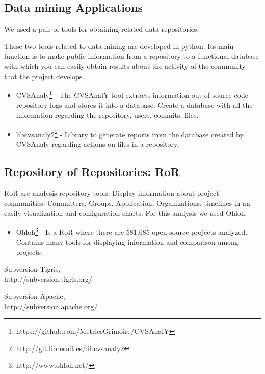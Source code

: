 \documentclass[11pt]{scrartcl}
\begin{document}
\subsection{Data mining Applications}

We used a pair of tools for obtaining related data repositories.

\par These two tools related to data mining are developed in python. Its main function is to make public information from a repository to a functional database with which you can easily obtain results about the activity of the community that the project develops.

\begin{itemize}
    \item CVSAnaly\footnote{https://github.com/MetricsGrimoire/CVSAnalY} - The CVSAnalY tool extracts information out of source code repository logs and stores it into a database. Create a database with all the information regarding the repository, users, commits, files.
    \item libcvsanaly2\footnote{http://git.libresoft.es/libcvsanaly2} - Library to generate reports from the database created by CVSAnaly regarding actions on files in a repository.
\end{itemize}

\subsection{Repository of Repositories: RoR}

RoR are analysis repository tools. Display information about project communities: Committers, Groups, Application, Organizations, timelines in an easily visualization and configuration charts. For this analysis we used Ohloh.

\begin{itemize}
    \item Ohloh\footnote{http://www.ohloh.net/} - Is a RoR where there are 581,685 open source projects analyzed. Contains many tools for displaying information and comparison among projects.
\end{itemize}

\begin{thebibliography}{9}

  Subversion Tigris,\\
  http://subversion.tigris.org/

  Subversion Apache,\\
  http://subversion.apache.org/

\end{thebibliography}
\end{document}
